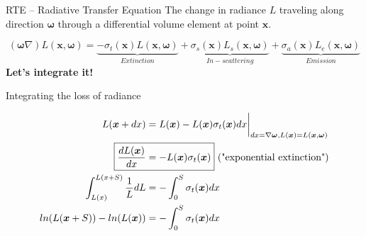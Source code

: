 \documentclass[
  english,            %
  aspectratio=169,    %
]{tumbeamer}
\newcommand\bx[0]{\bm{x}}
\newcommand\bomega[0]{\bm{\omega}}
\begin{document}
\begin{frame}{RTE -- Radiative Transfer Equation}
    The change in radiance $L$ traveling along direction $\boldsymbol{\omega}$
    through a differential volume element at point $\boldsymbol{x}$.
    \begin{figure}[ht]
        \centering
        \scalebox{.7}{
            
        }
    \end{figure}
    \begin{equation} 
        \label{eq:RTE}
        (\bomega \nabla)L(\bx,\bomega) =
        \underbrace{ - \sigma_t(\bx)L(\bx,\bomega)}
        _{Extinction}
        + 
        \underbrace{\sigma_s(\bx)L_s(\bx,\bomega)}
        _{In-scattering}
        + 
        \underbrace{\sigma_a(\bx)L_e(\bx,\bomega)}
        _{Emission}
    \end{equation}
    \centering
    \vfill
    \textbf{Let's integrate it!}
\end{frame}

\begin{frame}{Integrating the loss of radiance}
\begin{figure}[ht]
    \centering
    \scalebox{.6}{
        
    }
    \begin{align}
    \begin{aligned}
        L(\bx + dx) &= 
            L(\bx) - L(\bx)\sigma_t(\bx)dx\bigg|_{dx=\nabla\bomega,
            L(\bx)=L(\bx, \bomega)} \\
        \Aboxed{\frac{dL(\bx)}{dx} &=
        -L(\bx)\sigma_t(\bx)} \text{ ("exponential extinction")}\\
        \int_{L(x)}^{L(x+S)} \frac{1}{L} dL &= -\int_0^S \sigma_t(\bx)dx\\
        ln(L(\bx+S)) - ln(L(\bx)) &= - \int_0^S \sigma_t(\bx) dx
    \end{aligned}
    \end{align}

\end{figure}
\end{frame}
\end{document}
